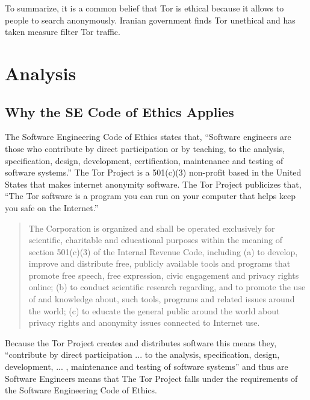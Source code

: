 \documentclass[11pt]{article}
\begin{document}
\begin{multicols}{2}
To summarize, it is a common belief that Tor is ethical because it allows to
people to search anonymously. Iranian government finds Tor unethical and has
taken measure filter Tor traffic.




\section{Analysis}

\subsection{Why the SE Code of Ethics Applies} 

The Software Engineering Code of Ethics states that, ``Software engineers are
those who contribute by direct participation or by teaching, to the analysis,
specification, design, development, certification, maintenance and testing of
software systems.'' \cite{SE:CodeOfEthics} The Tor Project is a 501(c)(3)
non-profit based in the United States that makes internet anonymity
software.\cite{Tor:FAQ, Tor:CorePeople} The Tor Project publicizes that, ``The
Tor software is a program you can run on your computer that helps keep you safe
on the Internet.''\cite{Tor:FAQ} 

\begin{quotation}
  The Corporation is organized and shall be operated exclusively for scientific,
  charitable and educational purposes within the meaning of section 501(c)(3) of
  the Internal Revenue Code, including (a) to develop, improve and distribute
  free, publicly available tools and programs that promote free speech, free
  expression, civic engagement and privacy rights online; (b) to conduct
  scientific research regarding, and to promote the use of and knowledge about,
  such tools, programs and related issues around the world; (c) to educate the
  general public around the world about privacy rights and anonymity issues
  connected to Internet use.
  \cite{TOR:Sponsorship}
\end{quotation}
  
Because the Tor Project creates and distributes
software this means they, ``contribute by direct participation ...  to the
analysis, specification, design, development, ... , maintenance and testing of
software systems'' and thus are Software Engineers means that The Tor Project
falls under the requirements of the Software Engineering Code of
Ethics.\cite{Tor:FAQ, Tor:Overview} 



\end{multicols}
\end{document}

